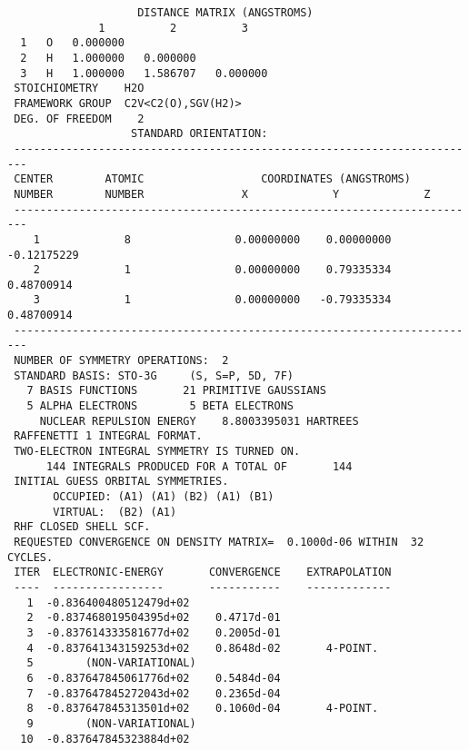 {\begin{verbatim}
                    DISTANCE MATRIX (ANGSTROMS)
              1          2          3
  1   O   0.000000
  2   H   1.000000   0.000000
  3   H   1.000000   1.586707   0.000000
 STOICHIOMETRY    H2O
 FRAMEWORK GROUP  C2V<C2(O),SGV(H2)>
 DEG. OF FREEDOM    2
                   STANDARD ORIENTATION:
 ------------------------------------------------------------------------
 CENTER        ATOMIC                  COORDINATES (ANGSTROMS)
 NUMBER        NUMBER               X             Y             Z
 ------------------------------------------------------------------------
    1             8                0.00000000    0.00000000   -0.12175229
    2             1                0.00000000    0.79335334    0.48700914
    3             1                0.00000000   -0.79335334    0.48700914
 ------------------------------------------------------------------------
 NUMBER OF SYMMETRY OPERATIONS:  2
 STANDARD BASIS: STO-3G     (S, S=P, 5D, 7F)
   7 BASIS FUNCTIONS       21 PRIMITIVE GAUSSIANS
   5 ALPHA ELECTRONS        5 BETA ELECTRONS
     NUCLEAR REPULSION ENERGY    8.8003395031 HARTREES
 RAFFENETTI 1 INTEGRAL FORMAT.
 TWO-ELECTRON INTEGRAL SYMMETRY IS TURNED ON.
      144 INTEGRALS PRODUCED FOR A TOTAL OF       144
 INITIAL GUESS ORBITAL SYMMETRIES.
       OCCUPIED: (A1) (A1) (B2) (A1) (B1)
       VIRTUAL:  (B2) (A1)
 RHF CLOSED SHELL SCF.
 REQUESTED CONVERGENCE ON DENSITY MATRIX=  0.1000d-06 WITHIN  32 CYCLES.
 ITER  ELECTRONIC-ENERGY       CONVERGENCE    EXTRAPOLATION
 ----  -----------------       -----------    -------------
   1  -0.836400480512479d+02                                        
   2  -0.837468019504395d+02    0.4717d-01
   3  -0.837614333581677d+02    0.2005d-01
   4  -0.837641343159253d+02    0.8648d-02       4-POINT.
   5        (NON-VARIATIONAL)
   6  -0.837647845061776d+02    0.5484d-04
   7  -0.837647845272043d+02    0.2365d-04
   8  -0.837647845313501d+02    0.1060d-04       4-POINT.
   9        (NON-VARIATIONAL)
  10  -0.837647845323884d+02


\end{verbatim}}
